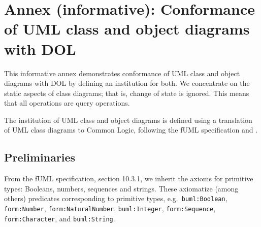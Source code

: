\documentclass[10pt,fleqn,%
\ifpretendfinal
final%
\else
draft%
\fi,
]{scrreprt}
\newcommand{\infannex}[1]{ \chapter{Annex (informative): #1} }
\begin{document}
\infannex{Conformance of UML class and object diagrams with DOL}\label{a:uml-class}

This informative annex demonstrates conformance of UML class and
object diagrams with DOL by defining an institution for both. We
concentrate on the static aspects of class diagrams; that is, change
of state is ignored. This means that all operations are query
operations.

The institution of UML class and object diagrams is defined using a
translation of UML class diagrams to Common Logic, following the fUML
specification and \cite{Seidewitz08}.

\section{Preliminaries}

From the fUML specification, section 10.3.1, we inherit the axioms for
primitive types: Booleans, numbers, sequences and strings.  These
axiomatize (among others) predicates corresponding to primitive types,
e.g.\ \texttt{buml:Boolean}, \texttt{form:Number},
\texttt{form:NaturalNumber}, \texttt{buml:Integer},
\texttt{form:Sequence}, \texttt{form:Character}, and
\texttt{buml:String}.
\end{document}
